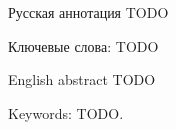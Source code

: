 \documentclass[../diploma.tex]{subfiles}
\begin{document}
Русская аннотация TODO

\vspace*{\fill}

Ключевые слова: TODO

\newpage

English abstract TODO
\vspace*{\fill}

Keywords: TODO.
\end{document}
